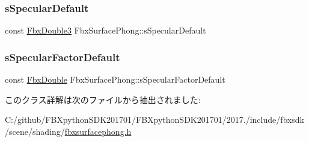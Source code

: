 \mbox{\label{class_fbx_surface_phong_ab42f5855747a5699e65b6dd6332b3f70}} 
\subsubsection{\texorpdfstring{s\+Specular\+Default}{sSpecularDefault}}
{\footnotesize\ttfamily const \hyperlink{fbxtypes_8h_ae0a96f14cde566774c7553aa7523b7a7}{Fbx\+Double3} Fbx\+Surface\+Phong\+::s\+Specular\+Default\hspace{0.3cm}{\ttfamily [static]}}

\mbox{\label{class_fbx_surface_phong_a4906b3c1de363105b0e0c32be098b7a5}} 
\subsubsection{\texorpdfstring{s\+Specular\+Factor\+Default}{sSpecularFactorDefault}}
{\footnotesize\ttfamily const \hyperlink{fbxtypes_8h_a171e72a1c46fc15c1a6c9c31948c1c5b}{Fbx\+Double} Fbx\+Surface\+Phong\+::s\+Specular\+Factor\+Default\hspace{0.3cm}{\ttfamily [static]}}



このクラス詳解は次のファイルから抽出されました\+:\begin{DoxyCompactItemize}
\item 
C\+:/github/\+F\+B\+Xpython\+S\+D\+K201701/\+F\+B\+Xpython\+S\+D\+K201701/2017./include/fbxsdk/scene/shading/\hyperlink{fbxsurfacephong_8h}{fbxsurfacephong.\+h}\end{DoxyCompactItemize}
